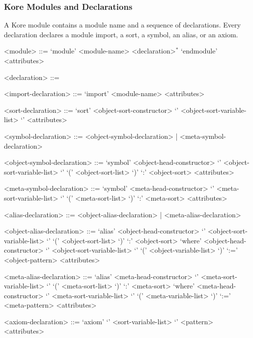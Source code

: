 \documentclass[UTF8,11pt]{article}
\theoremstyle{plain}
\theoremstyle{definition}
\theoremstyle{remark}
\begin{document}
\subsubsection{Kore Modules and Declarations}
\label{sec:kore-syntax-declarations}

A Kore module contains a module name and a sequence of declarations.
Every declaration declares a module import, a sort, a symbol, an alias, or an
axiom.

\begin{grammar}\small

<module> ::= \quad
\alt `module' <module-name> <declaration>$^*$
`endmodule' <attributes>

<declaration> ::= \quad
{}

<import-declaration> ::= `import' <module-name> <attributes>

<sort-declaration> ::= `sort'
<object-sort-constructor>  `{' <object-sort-variable-list> `}'
<attributes>

<symbol-declaration> ::= <object-symbol-declaration> |
<meta-symbol-declaration>

<object-symbol-declaration> ::= \quad
\alt `symbol' <object-head-constructor>
`{' <object-sort-variable-list> `}'
`(' <object-sort-list> `)' `:' <object-sort> <attributes>

<meta-symbol-declaration> ::= \quad
\alt `symbol' <meta-head-constructor>
`{' <meta-sort-variable-list> `}'
 `(' <meta-sort-list> `)' `:' <meta-sort> <attributes>

<alias-declaration> ::= <object-alias-declaration> | <meta-alias-declaration>

<object-alias-declaration> ::= \quad
\alt `alias' <object-head-constructor>
`{' <object-sort-variable-list> `}'
`(' <object-sort-list> `)' `:' <object-sort>
`where'
<object-head-constructor>
`{' <object-sort-variable-list> `}'
`(' <object-variable-list> `)'
`:='
<object-pattern>
<attributes>

<meta-alias-declaration> ::= \quad
\alt `alias' <meta-head-constructor>
`{' <meta-sort-variable-list> `}'
`(' <meta-sort-list> `)' `:' <meta-sort>
`where'
<meta-head-constructor>
`{' <meta-sort-variable-list> `}'
`(' <meta-variable-list> `)'
`:='
<meta-pattern>
<attributes>

<axiom-declaration> ::= `axiom' `{' <sort-variable-list> `}' <pattern>
<attributes>


\end{grammar}
\end{document}
